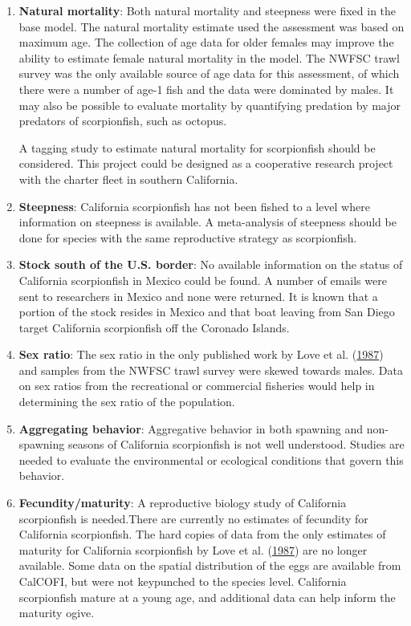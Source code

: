 \documentclass[12pt,]{article}
\begin{document}
\begin{enumerate}

\item \textbf{Natural mortality}: Both natural mortality and steepness were 
fixed in the base model.  The natural mortality estimate used the assessment 
was based on maximum age. The collection of age data for older females may improve 
the ability to estimate female natural mortality in the model.  The NWFSC trawl survey
was the only available source of age data for this assessment, of which there were a 
number of age-1 fish and the data were dominated by males.  It may also be possible 
to evaluate mortality by quantifying predation by major predators of scorpionfish, 
such as octopus. 

A tagging study to estimate natural mortality for scorpionfish should be 
considered.  This project could be designed as a cooperative research project 
with the charter fleet in southern California.

\item \textbf{Steepness}: California scorpionfish has not been fished to a level 
where information on steepness is available.  A meta-analysis of steepness should be done for 
species with the same reproductive strategy as scorpionfish.


\item \textbf{Stock south of the U.S. border}:  No available information on the status of California 
scorpionfish in Mexico could be found.  A number of emails were sent to researchers 
in Mexico and none were returned.  It is known that a portion of the stock resides 
in Mexico and that boat leaving from San Diego target California scorpionfish off 
the Coronado Islands.  

\item \textbf{Sex ratio}:  The sex ratio in the only published work by Love et al.
(\protect\hyperlink{ref-Love1987}{1987}) and samples 
from the NWFSC trawl survey were skewed towards males. Data on sex ratios from the 
recreational or commercial fisheries would help in determining the sex ratio of the population.


\item \textbf{Aggregating behavior}: Aggregative behavior in both spawning and 
non-spawning seasons of California scorpionfish is not well understood. Studies are 
needed to evaluate the environmental or ecological conditions that govern this behavior.



\item \textbf{Fecundity/maturity}: A reproductive biology study of California 
scorpionfish is needed.There are currently no estimates of fecundity 
for California scorpionfish.  The hard copies of data from the only
estimates of maturity for California scorpionfish by Love et al. 
(\protect\hyperlink{ref-Love1987}{1987}) are no longer available.  
Some data on the spatial distribution of the 
eggs are available from CalCOFI, but were not keypunched to the species level. 
California scorpionfish mature at a young age, and additional data can help 
inform the maturity ogive.


\end{enumerate}
\end{document}

